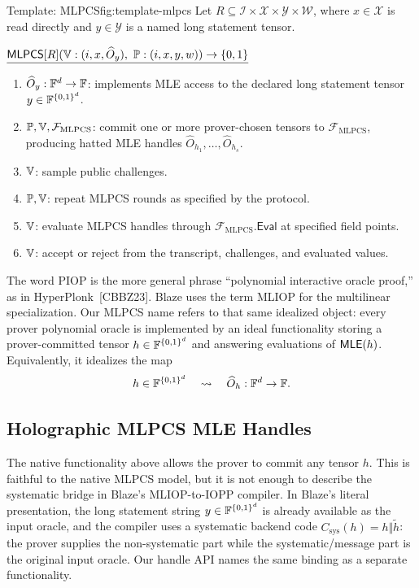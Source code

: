 \begin{protocolbox}{Template: MLPCS}{fig:template-mlpcs}
Let \(R\subseteq\mathcal I\times\mathcal X\times\mathcal Y\times\mathcal W\),
where \(x\in\mathcal X\) is read directly and \(y\in\mathcal Y\) is a named
long statement tensor.

\smallskip
\noindent\(\underline{\mathsf{MLPCS}[R](\mathbb{V}:(i,x,\widehat O_y),\ \mathbb{P}:(i,x,y,w))\to\{0,1\}}\)

\smallskip
\begin{enumerate}[leftmargin=0.24in,label=\textbf{A\arabic*.},itemsep=0.08em,topsep=0.1em,parsep=0pt]
  \item \(\widehat O_y:\mathbb{F}^d\to\mathbb{F}\): implements MLE access to the declared
        long statement tensor \(y\in\mathbb{F}^{\{0,1\}^d}\).
  \item \(\mathbb{P},\mathbb{V},\mathcal F_{\mathrm{MLPCS}}\): commit one
        or more prover-chosen tensors to \(\mathcal F_{\mathrm{MLPCS}}\),
        producing hatted MLE handles
        \(\widehat O_{h_1},\ldots,\widehat O_{h_s}\).
  \item \(\mathbb{V}\): sample public challenges.
  \item \(\mathbb{P},\mathbb{V}\): repeat MLPCS rounds as specified by the
        protocol.
  \item \(\mathbb{V}\): evaluate MLPCS handles through
        \(\mathcal F_{\mathrm{MLPCS}}.\mathsf{Eval}\) at specified field
        points.
  \item \(\mathbb{V}\): accept or reject from the transcript, challenges, and
        evaluated values.
\end{enumerate}
\end{protocolbox}

The word PIOP is the more general phrase ``polynomial interactive oracle
proof,'' as in HyperPlonk~[CBBZ23].  Blaze uses the term MLIOP for the
multilinear specialization.  Our MLPCS name refers to that same idealized
object: every prover polynomial oracle is implemented by an ideal functionality
storing a prover-committed tensor
\(h\in\mathbb{F}^{\{0,1\}^d}\) and answering evaluations of \(\mathsf{MLE}(h)\).  Equivalently, it
idealizes the map
\[
  h\in\mathbb{F}^{\{0,1\}^d}
  \quad\leadsto\quad
  \widehat O_h:\mathbb{F}^d\to\mathbb{F}.
\]

\subsection{Holographic MLPCS MLE Handles}

The native functionality above allows the prover to commit any tensor \(h\).
This is faithful to the native MLPCS model, but it is not enough to describe
the systematic bridge in Blaze's MLIOP-to-IOPP compiler.  In Blaze's literal
presentation, the long statement string \(y\in\mathbb{F}^{\{0,1\}^d}\) is already available
as the input oracle, and the compiler uses a systematic backend code
\(C_{\mathrm{sys}}(h)=h\Vert\widetilde h\): the prover supplies the
non-systematic part while the systematic/message part is the original input
oracle.  Our handle API names the same binding as a separate functionality.

